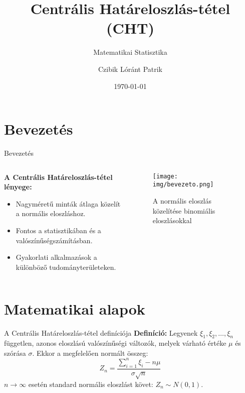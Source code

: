 \documentclass[aspectratio=169,12pt]{beamer}
\title{Centrális Határeloszlás-tétel (CHT)}
\subtitle{Matematikai Statisztika}
\author{Czibik Lóránt Patrik}
\institute{Miskolci Egyetem}
\date{\today}
\begin{document}
	\begin{frame}
		\titlepage
	\end{frame}
	
	\section{Bevezetés}
	\begin{frame}{Bevezetés}
		\begin{columns}
			\begin{column}{0.6\textwidth}
				\textbf{A Centrális Határeloszlás-tétel lényege:}
				\begin{itemize}
					\item Nagyméretű minták átlaga közelít a normális eloszláshoz.
					\item Fontos a statisztikában és a valószínűségszámításban.
					\item Gyakorlati alkalmazások a különböző tudományterületeken.
				\end{itemize}
			\end{column}
			\begin{column}{0.4\textwidth}
				\begin{figure}
					\texttt{[image: img/bevezeto.png]}
					\caption{A normális eloszlás közelítése binomiális eloszlásokkal}
				\end{figure}
			\end{column}
		\end{columns}
	\end{frame}
	
	\section{Matematikai alapok}
	\begin{frame}{A Centrális Határeloszlás-tétel definíciója}
		\textbf{Definíció:} Legyenek $\xi_1, \xi_2, \ldots, \xi_n$ független, azonos eloszlású valószínűségi változók, melyek várható értéke $\mu$ és szórása $\sigma$. Ekkor a megfelelően normált összeg:
		\begin{equation}
			Z_n = \frac{\sum_{i=1}^{n} \xi_i - n \mu}{\sigma \sqrt{n}}
		\end{equation}
		$n \to \infty$ esetén standard normális eloszlást követ: $Z_n \sim N(0,1)$.
	\end{frame}
	
\end{document}
